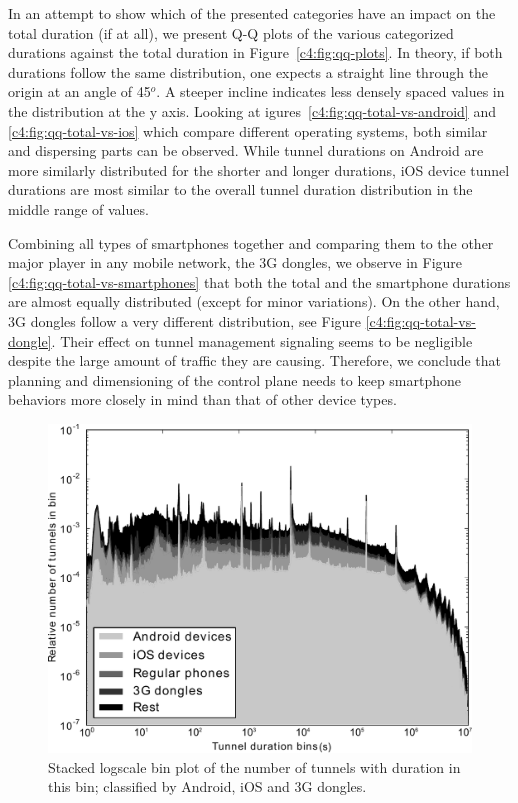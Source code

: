In an attempt to show which of the presented categories have an impact on the total duration (if at all), we present Q-Q plots of the various categorized durations against the total duration in Figure~\ref{c4:fig:qq-plots}. In theory, if both durations follow the same distribution, one expects a straight line through the origin at an angle of 45$^o$. A steeper incline indicates less densely spaced values in the distribution at the y axis. Looking at igures~\ref{c4:fig:qq-total-vs-android} and \ref{c4:fig:qq-total-vs-ios} which compare different operating systems, both similar and dispersing parts can be observed. While tunnel durations on Android  are more similarly distributed for the shorter and longer durations, iOS device tunnel durations are most similar to the overall tunnel duration distribution in the middle range of values.

Combining all types of smartphones together and comparing them to the other major player in any mobile network, the 3G dongles, we observe in Figure \ref{c4:fig:qq-total-vs-smartphones} that both the total and the smartphone durations are almost equally distributed (except for minor variations). On the other hand, 3G dongles follow a very different distribution, see Figure \ref{c4:fig:qq-total-vs-dongle}. Their effect on tunnel management signaling seems to be negligible despite the  large amount of traffic they are causing. Therefore, we conclude that planning and dimensioning of the control plane needs to keep smartphone behaviors more closely in mind than that of other device types.


\begin{figure}[htbp]
	\centering
	\includegraphics[width=1.0\textwidth]{images/stacked-durations-2-fixed.pdf}
	\caption{Stacked logscale bin plot of the number of tunnels with duration in this bin; classified by Android, iOS and 3G dongles.}
	\label{c4:fig:stacked-durations}
\end{figure}

